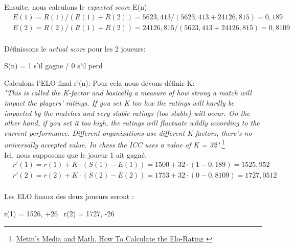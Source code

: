    Ensuite, nous calculons le \textit{expected score} E(n):
    \begin{equation}
        \begin{split}
            & E(1) = R(1) / ( R(1) + R(2)) = 5623,413 / (5623,413 + 24126,815) = 0,189 \\
            & E(2) = R(2) / ( R(1) + R(2)) = 24126,815 / (5623,413 + 24126,815) = 0,8109 \\
        \end{split}
    \end{equation}

    Définissons le \textit{actual score} pour les 2 joueurs:
    \begin{center}
        S(n) = 1 s'il gagne / 0 s'il perd
    \end{center}

    Calculons l'ELO final r'(n):
    Pour cela nous devons définir K: \\
    \textit{"This is called the K-factor and basically a measure of how strong a match will impact the players’ ratings.
    If you set K too low the ratings will hardly be impacted by the matches and very stable ratings (too stable) will occur.
    On the other hand, if you set it too high, the ratings will fluctuate wildly according to the current performance.
     Different organizations use different K-factors, there’s no universally accepted value. In chess the ICC uses a value of K = 32".}\footnote{\href{https://metinmediamath.wordpress.com/2013/11/27/how-to-calculate-the-elo-rating-including-example/}{Metin's Media and Math, How To Calculate the Elo-Rating }} \\
    Ici, nous supposons que le joueur 1 ait gagné.
    \begin{equation}
        \begin{split}
           & r'(1) = r(1) + K \cdot (S(1) - E(1)) = 1500 + 32 \cdot (1 - 0,189) = 1525,952 \\
           & r'(2) = r(2) + K \cdot (S(2) - E(2)) = 1753 + 32 \cdot (0-0,8109) = 1727,0512 \\
        \end{split}
    \end{equation}

    Les ELO finaux des deux joueurs seront :
    \begin{center}
        r(1) = 1526, +26 \ r(2) = 1727, -26
    \end{center}


